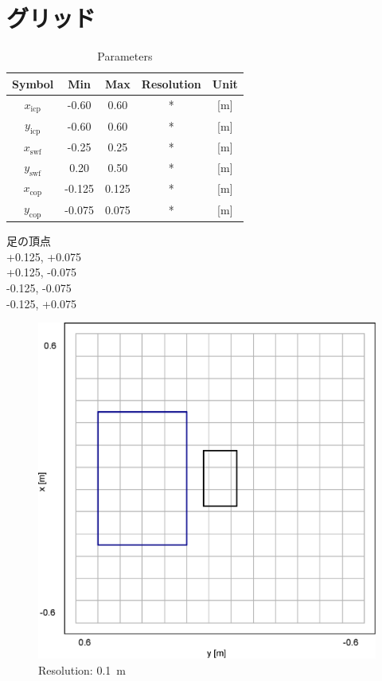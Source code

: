 \documentclass[main]{subfiles}
\begin{document}
\section{グリッド}
\begin{table}[H]
  \centering
  \caption{Parameters}
  \begin{tabular}{ccccc}
		\hline
    \textbf{Symbol} & \textbf{Min} & \textbf{Max} & \textbf{Resolution} & \textbf{Unit} \\ \hline \hline
    $x_\mathrm{icp}$ & -0.60 & 0.60 & * & [m] \\
    $y_\mathrm{icp}$ & -0.60 & 0.60 & * & [m] \\
    $x_\mathrm{swf}$ & -0.25 & 0.25 & * & [m] \\
    $y_\mathrm{swf}$ &  0.20 & 0.50 & * & [m] \\
    $x_\mathrm{cop}$ & -0.125 & 0.125 & * & [m] \\
    $y_\mathrm{cop}$ & -0.075 & 0.075 & * & [m] \\
    \hline
  \end{tabular}
\end{table}
足の頂点\\
+0.125, +0.075\\
+0.125, -0.075\\
-0.125, -0.075\\
-0.125, +0.075\\
\begin{figure}[H]
  \centering
  \includegraphics[width = 100 mm]{graph/grid/0.1.eps}
  \caption{Resolution: \SI{0.1}{m}}
\end{figure}
\end{document}
